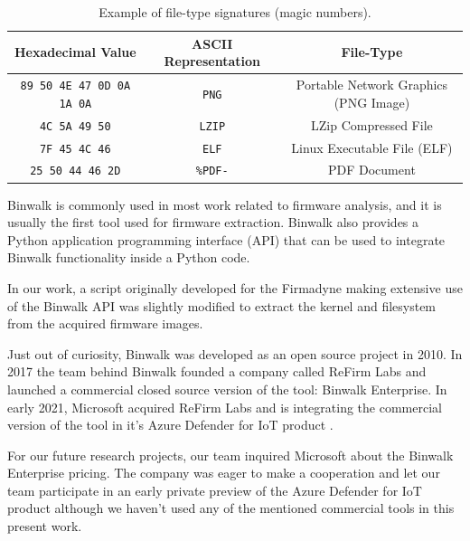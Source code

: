 \begin{table}[h]
\centering
\caption{Example of file-type signatures (magic numbers).}
\begin{tabular}{ccc}
\hline
\textbf{Hexadecimal Value}                                 & \textbf{ASCII Representation}                & \textbf{File-Type}                   \\ \hline
{\tt \footnotesize 89 50 4E 47 0D 0A 1A 0A}                & {\tt PNG}                     & Portable Network Graphics (PNG Image)\\ 
{\tt \footnotesize 4C 5A 49 50}                            & {\tt LZIP}                    & LZip Compressed File                 \\
{\tt \footnotesize 7F 45 4C 46}                            & {\tt ELF}                     & Linux Executable File (ELF)          \\
{\tt \footnotesize 25 50 44 46 2D}                         & {\tt \%PDF-}                  & PDF Document                         \\ 
\hline
\end{tabular}
\label{tab:magic-numbers}
\end{table}


Binwalk is commonly used in most work related to firmware analysis, and it is usually the first tool used for firmware extraction. Binwalk also provides a Python application programming interface (API) that can be used to integrate Binwalk functionality inside a Python code.

In our work, a script originally developed for the Firmadyne \cite{firmadyne} making extensive use of the Binwalk API was slightly modified to extract the kernel and filesystem from the acquired firmware images.

Just out of curiosity, Binwalk was developed as an open source project in 2010. In 2017 the team behind Binwalk founded a company called ReFirm Labs and launched a commercial closed source version of the tool: Binwalk Enterprise. In early 2021, Microsoft acquired ReFirm Labs and is integrating the commercial version of the tool in it's Azure Defender for IoT product \cite{microsoft-refirmlabs}.

For our future research projects, our team inquired Microsoft about the Binwalk Enterprise pricing. The company was eager to make a cooperation and let our team participate in an early private preview of the Azure Defender for IoT product although we haven't used any of the mentioned commercial tools in this present work.

